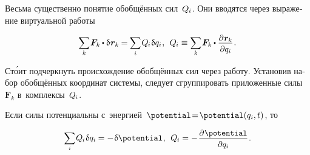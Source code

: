 \begin{otherlanguage}{russian}
Весьма существенно понятие обобщённых сил~${Q_{\hspace{-0.1ex}i}}$.
Они вводятся через выражение виртуальной работы

\nopagebreak\vspace{-0.25em}\begin{equation}
\scalebox{0.92}[0.96]{$ \displaystyle \sum_{\smash{k}} $} \hspace{.16ex}
\bm{F}_k \hspace{-0.1ex} \dotp \variation{\hspace{.1ex}\locationvector_k} \hspace{-0.1ex}
= \hspace{-0.1ex} \scalebox{0.92}[0.96]{$\displaystyle \sum_{i}$} \hspace{.16ex} Q_{\hspace{-0.1ex}i} \hspace{.12ex} \variation{q_i} \hspace{.1ex} ,
\:\:
Q_{\hspace{-0.1ex}i} \equiv
\scalebox{0.92}[0.96]{$ \displaystyle \sum_{\smash{k}} $} \hspace{.16ex}
\bm{F}_k \hspace{-0.1ex} \dotp \scalebox{0.96}{$ \displaystyle \frac{\raisemath{-0.12em}{\partial \hspace{.1ex} \locationvector_k}}{\raisemath{-0.1em}{\partial q_i}} $} \hspace{.16ex} .
\vspace{-0.1em}\end{equation}

\vspace{-0.15em}\noindent
Ст\'{о}ит подчеркнуть происхождение обобщённых сил через работу.
Установив набор обобщённых координат системы, следует сгруппировать приложенные силы~${\bm{F}_k}$ в~комплексы~${Q_{\hspace{-0.1ex}i}}$.

Если силы потенциальны с~энергией~${\potential \!=\! \potential(q_i, t)}$, то

\nopagebreak\vspace{-0.2em}\begin{equation}
\scalebox{0.92}[0.96]{$\displaystyle \sum_{i}$} \hspace{.16ex} Q_{\hspace{-0.1ex}i} \hspace{.12ex} \variation{q_i} \hspace{-0.1ex}
= - \hspace{.16ex} \variation{\potential} \hspace{.1ex} ,
\:\:
Q_{\hspace{-0.1ex}i} = - \hspace{.16ex} \scalebox{0.96}{$ \displaystyle \frac{\raisemath{-0.12em}{\partial \hspace{.1ex} \potential}}{\raisemath{-0.1em}{\partial q_i}} $} \hspace{.16ex} .
\vspace{-0.1em}\end{equation}


\end{otherlanguage}
